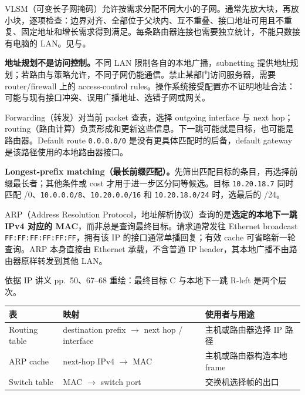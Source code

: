 VLSM（可变长子网掩码）允许按需求分配不同大小的子网。通常先放大块，再放小块，逐项检查：边界对齐、全部位于父块内、互不重叠、接口地址可用且不重复、固定地址和增长需求得到满足。每条路由器连接也需要独立统计，不能只数接有电脑的 LAN。见与。

\textbf{地址规划不是访问控制。}不同 LAN 限制各自的本地广播，subnetting 提供地址规划；若路由与策略允许，不同子网仍能通信。禁止某部门访问服务器，需要 router/firewall 上的 access-control rules。操作系统接受配置亦不证明地址合法：可能与现有接口冲突、误用广播地址、选错子网或网关。


Forwarding（转发）对当前 packet 查表，选择 outgoing interface 与 next hop；routing（路由计算）负责形成和更新这些信息。下一跳可能就是目标，也可能是路由器。Default route \texttt{0.0.0.0/0} 是没有更具体匹配时的后备，default gateway 是该路径使用的本地路由器接口。

\textbf{Longest-prefix matching（最长前缀匹配）。}先筛出匹配目标的条目，再选择前缀最长者；其他条件或 cost 才用于进一步区分同等候选。目标 \texttt{10.20.18.7} 同时匹配 /0、\texttt{10.0.0.0/8}、\texttt{10.20.0.0/16} 和 \texttt{10.20.18.0/24} 时，选最后的 /24。

ARP（Address Resolution Protocol，地址解析协议）查询的是\textbf{选定的本地下一跳 IPv4 对应的 MAC}，而非总是查询最终目标。请求通常发往 Ethernet broadcast \texttt{FF:FF:FF:FF:FF:FF}，拥有该 IP 的接口通常单播回复；有效 cache 可省略新一轮查询。ARP 本身直接由 Ethernet 承载，不含普通 IP header，其本地广播不由路由器原样转发到其他 LAN。

\begin{center}


\small 依据 IP 讲义 pp.~50、67--68 重绘：最终目标 C 与本地下一跳 R-left 是两个层次。
\end{center}

\begin{center}
\small
\begin{tabularx}{\textwidth}{@{}lXX@{}}
\toprule
表 & 映射 & 使用者与用途 \\
\midrule
Routing table & destination prefix $\to$ next hop / interface & 主机或路由器选择 IP 路径 \\
ARP cache & next-hop IPv4 $\to$ MAC & 主机或路由器构造本地 frame \\
Switch table & MAC $\to$ switch port & 交换机选择帧的出口 \\
\bottomrule
\end{tabularx}
\end{center}

